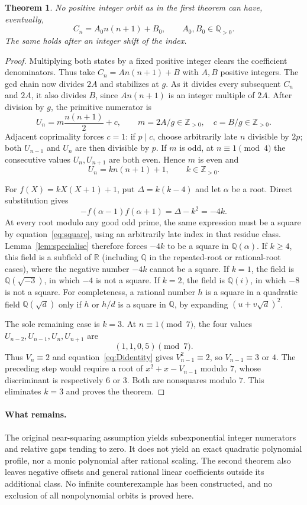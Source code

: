 \documentclass[11pt]{article}
\newtheorem{theorem}{Theorem}
\begin{document}
\begin{theorem}\label{thm:positiveoffset}
No positive integer orbit as in the first theorem can have, eventually,
\[
 C_n=A_0 n(n+1)+B_0,\qquad A_0,B_0\in\mathbb Q_{>0}.
\]
The same holds after an integer shift of the index.
\end{theorem}
\begin{proof}
Multiplying both states by a fixed positive integer clears the
coefficient denominators. Thus take $C_n=A n(n+1)+B$ with $A,B$
positive integers. The gcd chain now divides $2A$ and stabilizes at
$g$. As it divides every subsequent $C_n$ and $2A$, it also divides
$B$, since $A n(n+1)$ is an integer multiple of $2A$.
After division by $g$, the primitive numerator is
\[
 U_n=m\frac{n(n+1)}2+c,\qquad m=2A/g\in\mathbb Z_{>0},
 \quad c=B/g\in\mathbb Z_{>0}.
\]
Adjacent coprimality forces $c=1$: if $p\mid c$, choose arbitrarily
late $n$ divisible by $2p$; both $U_{n-1}$ and $U_n$ are then
divisible by $p$. If $m$ is odd, at $n\equiv1\pmod4$ the consecutive
values $U_n,U_{n+1}$ are both even. Hence $m$ is even and
\[
 U_n=k n(n+1)+1,\qquad k\in\mathbb Z_{>0}.
\]

For $f(X)=kX(X+1)+1$, put $\Delta=k(k-4)$ and let $\alpha$ be a
root. Direct substitution gives
\[
 -f(\alpha-1)f(\alpha+1)=\Delta-k^2=-4k.
\]
At every root modulo any good odd prime, the same expression must
be a square by equation~\eqref{eq:square}, using an arbitrarily late
index in that residue class. Lemma~\ref{lem:specialise} therefore
forces $-4k$ to be a square in $\mathbb Q(\alpha)$.
If $k\ge4$, this field is a subfield of $\mathbb R$ (including
$\mathbb Q$ in the repeated-root or rational-root cases), where the
negative number $-4k$ cannot be a square. If $k=1$, the field is
$\mathbb Q(\sqrt{-3})$, in which $-4$ is not a square. If $k=2$,
the field is $\mathbb Q(i)$, in which $-8$ is not a square.
For completeness, a rational number $h$ is a square in a quadratic
field $\mathbb Q(\sqrt d)$ only if $h$ or $h/d$ is a square in
$\mathbb Q$, by expanding $(u+v\sqrt d)^2$.

The sole remaining case is $k=3$. At $n\equiv1\pmod7$, the four
values $U_{n-2},U_{n-1},U_n,U_{n+1}$ are
\[
 (1,1,0,5)\pmod7.
\]
Thus $V_n\equiv2$ and equation~\eqref{eq:Didentity} gives
$V_{n-1}^2\equiv2$, so $V_{n-1}\equiv3$ or $4$.
The preceding step would require a root of
$x^2+x-V_{n-1}$ modulo $7$, whose discriminant is respectively
$6$ or $3$. Both are nonsquares modulo $7$. This eliminates $k=3$
and proves the theorem.
\end{proof}

\paragraph{What remains.}
The original near-squaring assumption yields subexponential integer
numerators and relative gaps tending to zero. It does not yield an
exact quadratic polynomial profile, nor a monic polynomial after
rational scaling. The second theorem also leaves negative offsets and
general rational linear coefficients outside its additional class.
No infinite counterexample has been constructed, and
no exclusion of all nonpolynomial orbits is proved here.
\end{document}

